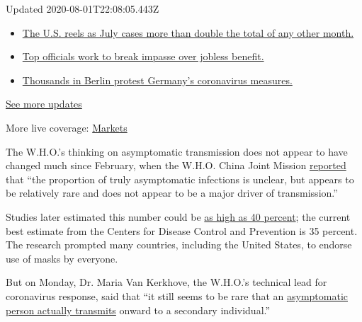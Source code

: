 Updated 2020-08-01T22:08:05.443Z

\begin{itemize}
\tightlist
\item
  \href{https://www.nytimes.com/2020/08/01/world/coronavirus-covid-19.html?action=click\&pgtype=Article\&state=default\&region=MAIN_CONTENT_1\&context=storylines_live_updates\#link-34047410}{The
  U.S. reels as July cases more than double the total of any other
  month.}
\item
  \href{https://www.nytimes.com/2020/08/01/world/coronavirus-covid-19.html?action=click\&pgtype=Article\&state=default\&region=MAIN_CONTENT_1\&context=storylines_live_updates\#link-3ac56579}{Top
  officials work to break impasse over jobless benefit.}
\item
  \href{https://www.nytimes.com/2020/08/01/world/coronavirus-covid-19.html?action=click\&pgtype=Article\&state=default\&region=MAIN_CONTENT_1\&context=storylines_live_updates\#link-25930521}{Thousands
  in Berlin protest Germany's coronavirus measures.}
\end{itemize}

\href{https://www.nytimes.com/2020/08/01/world/coronavirus-covid-19.html?action=click\&pgtype=Article\&state=default\&region=MAIN_CONTENT_1\&context=storylines_live_updates}{See
more updates}

More live coverage:
\href{https://www.nytimes.com/live/2020/07/31/business/stock-market-today-coronavirus?action=click\&pgtype=Article\&state=default\&region=MAIN_CONTENT_1\&context=storylines_live_updates}{Markets}

The W.H.O.'s thinking on asymptomatic transmission does not appear to
have changed much since February, when the W.H.O. China Joint Mission
\href{https://www.who.int/docs/default-source/coronaviruse/who-china-joint-mission-on-covid-19-final-report.pdf}{reported}
that ``the proportion of truly asymptomatic infections is unclear, but
appears to be relatively rare and does not appear to be a major driver
of transmission.''

Studies later estimated this number could be
\href{https://www.nytimes.com/2020/03/31/health/coronavirus-asymptomatic-transmission.html}{as
high as 40 percent}; the current best estimate from the Centers for
Disease Control and Prevention is 35 percent. The research prompted many
countries, including the United States, to endorse use of masks by
everyone.

But on Monday, Dr. Maria Van Kerkhove, the W.H.O.'s technical lead for
coronavirus response, said that ``it still seems to be rare that an
\href{https://twitter.com/mvankerkhove/status/1270081494552281094}{asymptomatic
person actually transmits} onward to a secondary individual.''

